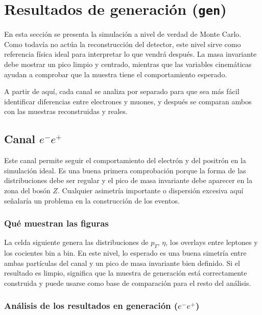 \documentclass[11pt]{article}
\begin{document}
    \hypertarget{resultados-de-generaciuxf3n-gen}{%
\section{\texorpdfstring{Resultados de generación
(\texttt{gen})}{Resultados de generación (gen)}}\label{resultados-de-generaciuxf3n-gen}}

En esta sección se presenta la simulación a nivel de verdad de Monte
Carlo. Como todavía no actúa la reconstrucción del detector, este nivel
sirve como referencia física ideal para interpretar lo que vendrá
después. La masa invariante debe mostrar un pico limpio y centrado,
mientras que las variables cinemáticas ayudan a comprobar que la muestra
tiene el comportamiento esperado.

A partir de aquí, cada canal se analiza por separado para que sea más
fácil identificar diferencias entre electrones y muones, y después se
comparan ambos con las muestras reconstruidas y reales.

    \hypertarget{canal-e-e}{%
\subsection{\texorpdfstring{Canal
\(e^-e^+\)}{Canal e\^{}-e\^{}+}}\label{canal-e-e}}

Este canal permite seguir el comportamiento del electrón y del positrón
en la simulación ideal. Es una buena primera comprobación porque la
forma de las distribuciones debe ser regular y el pico de masa
invariante debe aparecer en la zona del bosón \(Z\). Cualquier asimetría
importante o dispersión excesiva aquí señalaría un problema en la
construcción de los eventos.

    \hypertarget{quuxe9-muestran-las-figuras}{%
\subsubsection{Qué muestran las
figuras}\label{quuxe9-muestran-las-figuras}}

La celda siguiente genera las distribuciones de \(p_T\), \(\eta\), los
overlays entre leptones y los cocientes bin a bin. En este nivel, lo
esperado es una buena simetría entre ambas partículas del canal y un
pico de masa invariante bien definido. Si el resultado es limpio,
significa que la muestra de generación está correctamente construida y
puede usarse como base de comparación para el resto del análisis.

    \hypertarget{anuxe1lisis-de-los-resultados-en-generaciuxf3n-e-e}{%
\subsubsection{\texorpdfstring{Análisis de los resultados en generación
(\(e^-e^+\))}{Análisis de los resultados en generación (e\^{}-e\^{}+)}}\label{anuxe1lisis-de-los-resultados-en-generaciuxf3n-e-e}}
\end{document}

